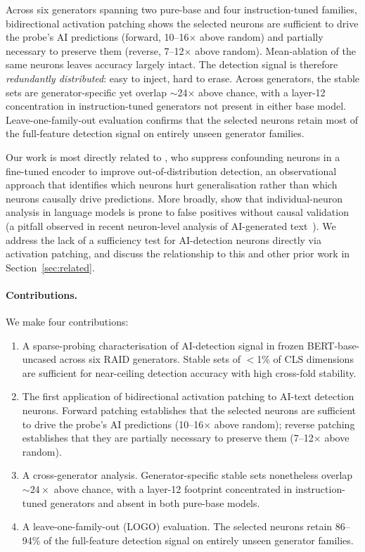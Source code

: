 \documentclass[11pt]{article}
\newcommand{\bertbase}{BERT-base-uncased\xspace}
\begin{document}
Across six generators spanning two pure-base and four instruction-tuned families, bidirectional activation patching shows the selected neurons are sufficient to drive the probe's AI predictions (forward, 10--16$\times$ above random) and partially necessary to preserve them (reverse, 7--12$\times$ above random). Mean-ablation of the same neurons leaves accuracy largely intact. The detection signal is therefore \textit{redundantly distributed}: easy to inject, hard to erase. Across generators, the stable sets are generator-specific yet overlap $\sim$24$\times$ above chance, with a layer-12 concentration in instruction-tuned generators not present in either base model. Leave-one-family-out evaluation confirms that the selected neurons retain most of the full-feature detection signal on entirely unseen generator families.

Our work is most directly related to \citet{borile2025confounding}, who suppress confounding neurons in a fine-tuned encoder to improve out-of-distribution detection, an observational approach that identifies which neurons hurt generalisation rather than which neurons causally drive predictions. More broadly, \citet{antverg2022pitfalls} show that individual-neuron analysis in language models is prone to false positives without causal validation (a pitfall observed in recent neuron-level analysis of AI-generated text~\citep{enkhbayar2025atomic}). We address the lack of a sufficiency test for AI-detection neurons directly via activation patching, and discuss the relationship to this and other prior work in Section~\ref{sec:related}.

\paragraph{Contributions.}
We make four contributions:
\begin{enumerate}
\item A sparse-probing characterisation of AI-detection signal in frozen \bertbase across six RAID generators. Stable sets of $<$1\% of CLS dimensions are sufficient for near-ceiling detection accuracy with high cross-fold stability.
\item The first application of bidirectional activation patching to AI-text detection neurons. Forward patching establishes that the selected neurons are sufficient to drive the probe's AI predictions (10--16$\times$ above random); reverse patching establishes that they are partially necessary to preserve them (7--12$\times$ above random).
\item A cross-generator analysis. Generator-specific stable sets nonetheless overlap ${\sim}24\times$ above chance, with a layer-12 footprint concentrated in instruction-tuned generators and absent in both pure-base models.
\item A leave-one-family-out (LOGO) evaluation. The selected neurons retain 86--94\% of the full-feature detection signal on entirely unseen generator families.
\end{enumerate}
\end{document}
